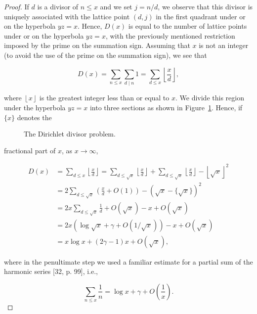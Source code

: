 \documentclass[10pt]{article}
\newcommand{\floor}[1]{\left\lfloor #1\right\rfloor}
\theoremstyle{plain}
\begin{document}
\begin{proof}
If $d$ is a divisor of $n \leq x$ and we set $j=n/d$, we observe that this divisor is uniquely associated with the lattice point $(d, j)$ in the first quadrant under or on the hyperbola $yz=x$. Hence, $D(x)$ is equal to the number of lattice points under or on the hyperbola $yz=x$, with the previously mentioned restriction imposed by the prime on the summation sign. Assuming that $x$ is not an integer (to avoid the use of the prime on the summation sign), we see that

$$
D(x)=\sum_{n \leq x} \sum_{d \mid n} 1=\sum_{d \leq x}\floor{\frac{x}{d}},
$$

where $\floor{x}$ is the greatest integer less than or equal to $x$. We divide this region under the hyperbola $yz=x$ into three sections as shown in Figure~\ref{fig:divisor-problem}. Hence, if $\{x\}$ denotes the

\begin{figure}[H]
\centering
{}
\caption{The Dirichlet divisor problem.}
\label{fig:divisor-problem}
\end{figure}

fractional part of $x$, as $x \to \infty$,

$$
\begin{aligned}
D(x) & =\sum_{d \leq x}\floor{\frac{x}{d}}=\sum_{d \leq \sqrt{x}}\floor{\frac{x}{d}}+\sum_{d \leq \sqrt{x}}\floor{\frac{x}{d}}-\floor{\sqrt{x}}^{2} \\
& =2 \sum_{d \leq \sqrt{x}}\left(\frac{x}{d}+O(1)\right)-(\sqrt{x}-\{\sqrt{x}\})^{2} \\
& =2 x \sum_{d \leq \sqrt{x}} \frac{1}{d}+O(\sqrt{x})-x+O(\sqrt{x}) \\
& =2 x(\log \sqrt{x}+\gamma+O(1 / \sqrt{x}))-x+O(\sqrt{x}) \\
& =x \log x+(2 \gamma-1) x+O(\sqrt{x}),
\end{aligned}
$$

where in the penultimate step we used a familiar estimate for a partial sum of the harmonic series [32, p. 99], i.e.,

$$
\sum_{n \leq x} \frac{1}{n}=\log x+\gamma+O\left(\frac{1}{x}\right) .
$$
\end{proof}
\end{document}
